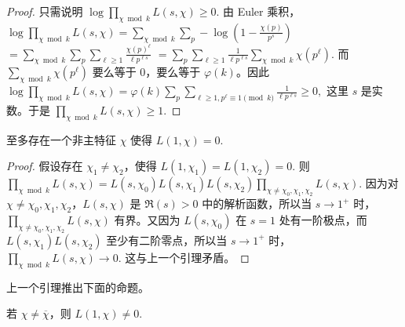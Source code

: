 \begin{proof}
	只需说明
	\(\textstyle \log\prod_{\chi\bmod k}L(s,\allowbreak{}\chi)\geq\allowbreak{} 0.\)
	由 Euler 乘积，
	\(\textstyle \log\prod_{\chi\bmod k}L(s,\allowbreak{}\chi) =\allowbreak{} \sum_{\chi\bmod k}\sum_p -\log\left(1-\frac{\chi(p)}{p^s}\right)\) \(\textstyle =\allowbreak{} \sum_{\chi\bmod k}\sum_p\sum_{\ell\geq\allowbreak{} 1} \frac{\chi(p)^\ell}{\ell p^{\ell s}}\) \(\textstyle =\allowbreak{} \sum_p\sum_{\ell\geq\allowbreak{} 1}\frac{1}{\ell p^{\ell s}} \sum_{\chi\bmod k}\chi(p^\ell).\)
	而
	\(\textstyle \sum_{\chi\bmod k}\chi(p^\ell)\)
	要么等于 $0$，要么等于 $\varphi(k)$。因此
	\(\textstyle \log\prod_{\chi\bmod k}L(s,\allowbreak{}\chi) =\allowbreak{} \varphi(k) \sum_p \sum_{\ell\geq\allowbreak{} 1,\allowbreak{} p^\ell\equiv\allowbreak{} 1\pmod k} \frac{1}{\ell p^{\ell s}} \geq\allowbreak{} 0,\allowbreak{}\)
	这里 $s$ 是实数。于是
	\(\textstyle \prod_{\chi\bmod k}L(s,\allowbreak{}\chi)\geq\allowbreak{} 1.\)
\end{proof}

\begin{lemma}
	至多存在一个非主特征 $\chi$ 使得
	\(\textstyle L(1,\allowbreak{}\chi)=\allowbreak{}0.\)
\end{lemma}

\begin{proof}
	假设存在 $\chi_1\neq\chi_2$，使得
	\(\textstyle L(1,\allowbreak{}\chi_1)=\allowbreak{}L(1,\allowbreak{}\chi_2)=\allowbreak{}0.\)
	则
	\(\textstyle \prod_{\chi\bmod k}L(s,\allowbreak{}\chi) =\allowbreak{} L(s,\allowbreak{}\chi_0)L(s,\allowbreak{}\chi_1)L(s,\allowbreak{}\chi_2) \prod_{\chi\neq\allowbreak{}\chi_0,\allowbreak{}\chi_1,\allowbreak{}\chi_2}L(s,\allowbreak{}\chi).\)
	因为对 $\chi\neq\chi_0,\chi_1,\chi_2$，$L(s,\chi)$ 是 $\Re(s)>0$ 中的解析函数，所以当 $s\to1^+$ 时，
	\(\textstyle \prod_{\chi\neq\allowbreak{}\chi_0,\allowbreak{}\chi_1,\allowbreak{}\chi_2}L(s,\allowbreak{}\chi)\)
	有界。又因为 $L(s,\chi_0)$ 在 $s=1$ 处有一阶极点，而
	\(\textstyle L(s,\allowbreak{}\chi_1)L(s,\allowbreak{}\chi_2)\)
	至少有二阶零点，所以当 $s\to1^+$ 时，
	\(\textstyle \prod_{\chi\bmod k}L(s,\allowbreak{}\chi)\to0.\)
	这与上一个引理矛盾。
\end{proof}

上一个引理推出下面的命题。

\begin{proposition}
	若 $\chi\neq\overline{\chi}$，则
	\(\textstyle L(1,\allowbreak{}\chi)\neq0.\)
\end{proposition}


